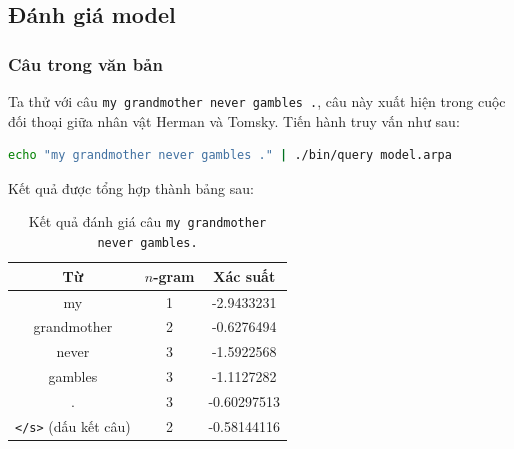 \documentclass[12pt]{article}
\begin{document}
\subsection{Đánh giá model}
\subsubsection{Câu trong văn bản}\label{danhgia-noov}
Ta thử với câu \texttt{my grandmother never gambles .}, câu này xuất hiện trong cuộc đối thoại giữa nhân vật Herman và Tomsky. Tiến hành truy vấn như sau:
\begin{lstlisting}[language=sh]
echo "my grandmother never gambles ." | ./bin/query model.arpa
\end{lstlisting}
\begin{figure}[H]
\end{figure}
\noindent Kết quả được tổng hợp thành bảng sau:
\begin{table}[H]
\centering
\begin{tabular}{|c|c|c|}
    \hline
    Từ & $n$-gram & Xác suất \\
    \hline
    my & 1 & -2.9433231\\
    grandmother & 2 & -0.6276494\\
    never & 3 & -1.5922568\\
    gambles & 3 & -1.1127282\\
    . & 3 & -0.60297513\\
    \texttt{</s>} (dấu kết câu) & 2 & -0.58144116\\
    \hline
\end{tabular}
\caption{Kết quả đánh giá câu \texttt{my grandmother never gambles.}}
\label{table:2}
\end{table}
\end{document}
